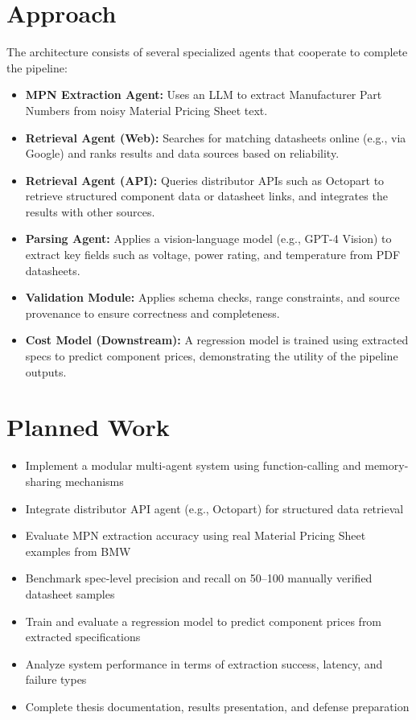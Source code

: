 \documentclass[11pt]{article}
\begin{document}
\section*{Approach}
The architecture consists of several specialized agents that cooperate to complete the pipeline:
\begin{itemize}
  \item \textbf{MPN Extraction Agent:} Uses an LLM to extract Manufacturer Part Numbers from noisy Material Pricing Sheet text.
  \item \textbf{Retrieval Agent (Web):} Searches for matching datasheets online (e.g., via Google) and  ranks results and data sources based on reliability.
  \item \textbf{Retrieval Agent (API):} Queries distributor APIs such as Octopart to retrieve structured component data or datasheet links, and integrates the results with other sources.
  \item \textbf{Parsing Agent:} Applies a vision-language model (e.g., GPT-4 Vision) to extract key fields such as voltage, power rating, and temperature from PDF datasheets.
  \item \textbf{Validation Module:} Applies schema checks, range constraints, and source provenance to ensure correctness and completeness.
  \item \textbf{Cost Model (Downstream):} A regression model is trained using extracted specs to predict component prices, demonstrating the utility of the pipeline outputs.
\end{itemize}


\section*{Planned Work}
\begin{itemize}
  \item Implement a modular multi-agent system using function-calling and memory-sharing mechanisms
  \item Integrate distributor API agent (e.g., Octopart) for structured data retrieval
  \item Evaluate MPN extraction accuracy using real Material Pricing Sheet examples from BMW
  \item Benchmark spec-level precision and recall on 50–100 manually verified datasheet samples
  \item Train and evaluate a regression model to predict component prices from extracted specifications
  \item Analyze system performance in terms of extraction success, latency, and failure types
  \item Complete thesis documentation, results presentation, and defense preparation
\end{itemize}
\end{document}
